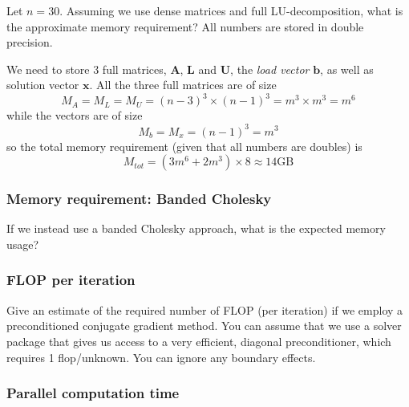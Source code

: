 \begin{question}
  Let $n=30$. Assuming we use dense matrices and full LU-decomposition, what is the approximate memory requirement? All numbers are stored in double precision.
\end{question}
We need to store 3 full matrices, $\mathbf{A}$, $\mathbf{L}$ and $\mathbf{U}$, the \emph{load vector} $\mathbf{b}$, as well as solution vector $\mathbf{x}$. All the three full matrices are of size
\[
  M_A = M_L = M_U = (n-3)^3\times (n-1)^3 = m^3\times m^3 = m^6
\]
while the vectors are of size
\[
  M_b = M_x = (n-1)^3 = m^3
\]
so the total memory requirement (given that all numbers are doubles) is
\begin{equation}
  M_{tot} = \left( 3m^6 + 2m^3 \right) \times 8 \approx 14 \mathrm{GB}
\end{equation}


\subsubsection{Memory requirement: Banded Cholesky} %
\label{ssub:memory_requirement_banded_cholesky}


\begin{question}
  If we instead use a banded Cholesky approach, what is the expected memory usage?
\end{question}


\subsubsection{FLOP per iteration} %
\label{ssub:flop_per_iteration}


\begin{question}
  Give an estimate of the required number of FLOP (per iteration) if we employ a preconditioned conjugate gradient method. You can assume that we use a solver package that gives us access to a very efficient, diagonal preconditioner, which requires 1 flop/unknown. You can ignore any boundary effects.
\end{question}


\subsubsection{Parallel computation time} %
\label{ssub:parallel_computation_time}

